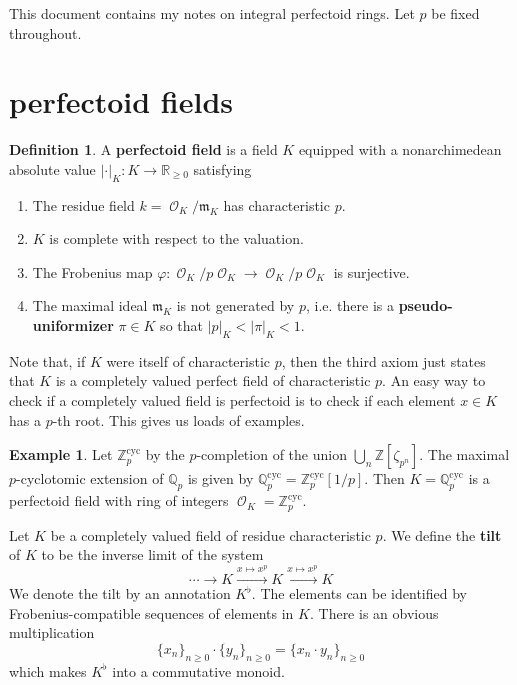 \documentclass[12pt]{amsproc}
\theoremstyle{definition}
\newtheorem*{definition}{Definition}
\newtheorem*{example}{Example}
\newcommand{\R}{\mathbb{R}}
\newcommand{\Q}{\mathbb{Q}}
\newcommand{\Z}{\mathbb{Z}}
\newcommand{\m}{\mathfrak{m}}
\newcommand{\ra}{\rightarrow}
\newcommand{\xra}{\xrightarrow}
\DeclareMathOperator{\Oh}{\mathscr{O}}
\begin{document}

This document contains my notes on integral perfectoid rings. Let $p$ be fixed throughout.

\section{perfectoid fields}
\begin{definition} A \textbf{perfectoid field} is a field $K$ equipped with a nonarchimedean absolute value $|\cdot|_K : K\ra \R_{\ge 0}$ satisfying
\begin{enumerate}
\item The residue field $k=\Oh_K/\m_K$ has characteristic $p$. 
\item $K$ is complete with respect to the valuation.
\item The Frobenius map $\varphi: \Oh_K/p\Oh_K \ra \Oh_K/p\Oh_K$ is surjective.
\item The maximal ideal $\m_K$ is not generated by $p$, i.e. there is a \textbf{pseudo-uniformizer} $\pi\in K$ so that $|p|_K < |\pi|_K < 1$.
\end{enumerate}
\end{definition}

Note that, if $K$ were itself of characteristic $p$, then the third axiom just states that $K$ is a completely valued perfect field of characteristic $p$. An easy way to check if a completely valued field is perfectoid is to check if each element $x\in K$ has a $p$-th root. This gives us loads of examples.

\begin{example}
Let $\Z_p^{\text{cyc}}$ by the $p$-completion of the union $\bigcup_n \Z[\zeta_{p^n}]$. The maximal $p$-cyclotomic extension of $\Q_p$ is given by $\Q_p^{\text{cyc}}=\Z_p^{\text{cyc}}[1/p]$. Then $K=\Q_p^{\text{cyc}}$ is a perfectoid field with ring of integers $\Oh_K=\Z^\text{cyc}_p$.
\end{example}

Let $K$ be a completely valued field of residue characteristic $p$. We define the \textbf{tilt} of $K$ to be the inverse limit of the system
\[	\cdots \ra K \xra{x\mapsto x^p} K \xra{x\mapsto x^p} K 	\]
We denote the tilt by an annotation $K^\flat$. The elements can be identified by Frobenius-compatible sequences of elements in $K$. There is an obvious multiplication
\[	\{x_n\}_{n\ge 0}\cdot \{y_n\}_{n\ge 0} = \{x_n\cdot y_n\}_{n\ge 0}	\]
which makes $K^\flat$ into a commutative monoid.
\end{document}
